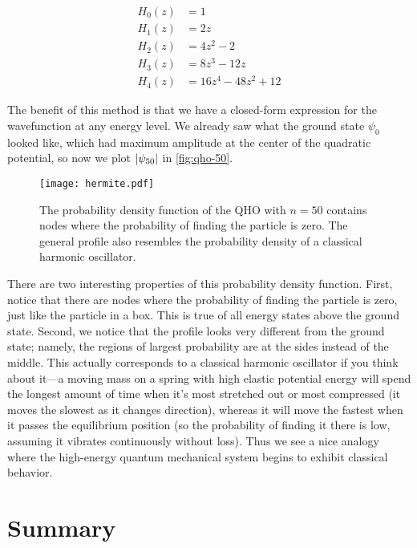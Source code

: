 \begin{align*}
	H_0(z) &= 1 \\
	H_1(z) &= 2z \\
	H_2(z) &= 4z^2-2 \\
	H_3(z) &= 8z^3 - 12z \\
	H_4(z) &= 16z^4 - 48z^2 + 12
\end{align*}

The benefit of this method is that we have a closed-form expression for the wavefunction at any energy level. 
We already saw what the ground state $\psi_0$ looked like, which had maximum amplitude at the center of the quadratic potential, so now we plot $\abs{\psi_{50}}$ in \autoref{fig:qho-50}.

\begin{figure}[!h]
	\centering
	\texttt{[image: hermite.pdf]}
	\caption{The probability density function of the QHO with $n = 50$ contains nodes where the probability of finding the particle is zero. 
	The general profile also resembles the probability density of a classical harmonic oscillator.}
	\label{fig:qho-50}
\end{figure}

There are two interesting properties of this probability density function. 
First, notice that there are nodes where the probability of finding the particle is zero, just like the particle in a box. 
This is true of all energy states above the ground state. 
Second, we notice that the profile looks very different from the ground state; namely, the regions of largest probability are at the sides instead of the middle. 
This actually corresponds to a classical harmonic oscillator if you think about it---a moving mass on a spring with high elastic potential energy will spend the longest amount of time when it's most stretched out or most compressed (it moves the slowest as it changes direction), whereas it will move the fastest when it passes the equilibrium position (so the probability of finding it there is low, assuming it vibrates continuously without loss). 
Thus we see a nice analogy where the high-energy quantum mechanical system begins to exhibit classical behavior.


\section{Summary}

